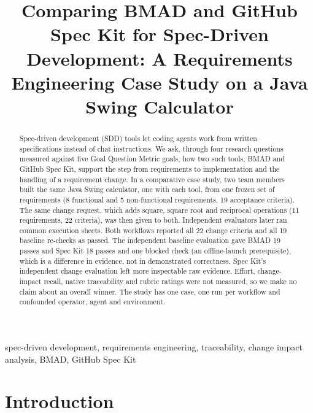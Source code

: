 \documentclass[conference]{IEEEtran}
\begin{document}
\title{Comparing BMAD and GitHub Spec Kit for Spec-Driven Development: A
Requirements Engineering Case Study on a Java Swing Calculator}

\author{
\and
{}
\and
{}
\and
{}
}

\maketitle

\begin{abstract}
Spec-driven development (SDD) tools let coding agents work from written
specifications instead of chat instructions. We ask, through four
research questions measured against five Goal Question Metric goals, how
two such tools, BMAD and GitHub Spec Kit, support the step from
requirements to implementation and the handling of a requirement change.
In a comparative case study, two team members built the same Java Swing
calculator, one with each tool, from one frozen set of requirements (8
functional and 5 non-functional requirements, 19 acceptance criteria).
The same change request, which adds square, square root and reciprocal
operations (11 requirements, 22 criteria), was then given to both.
Independent evaluators later ran common execution sheets. Both workflows
reported all 22 change criteria and all 19 baseline re-checks as passed.
The independent baseline evaluation gave BMAD 19 passes and Spec Kit 18
passes and one blocked check (an offline-launch prerequisite), which is
a difference in evidence, not in demonstrated correctness. Spec Kit's
independent change evaluation left more inspectable raw evidence.
Effort, change-impact recall, native traceability and rubric ratings
were not measured, so we make no claim about an overall winner. The
study has one case, one run per workflow and confounded operator, agent
and environment.
\end{abstract}

\begin{IEEEkeywords}
spec-driven development, requirements engineering, traceability, change
impact analysis, BMAD, GitHub Spec Kit
\end{IEEEkeywords}

\section{Introduction}\label{introduction}
\end{document}
